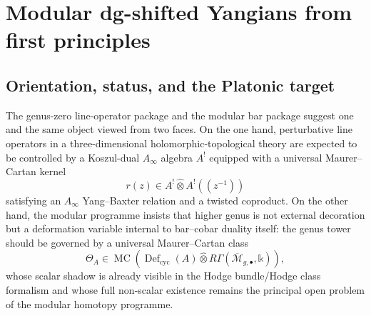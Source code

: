 

\providecommand{\MC}{\operatorname{MC}}
\providecommand{\Conf}{\operatorname{Conf}}
\providecommand{\Bar}{\operatorname{Bar}}
\providecommand{\Def}{\operatorname{Def}}
\providecommand{\Hom}{\operatorname{Hom}}
\providecommand{\im}{\operatorname{im}}
\providecommand{\id}{\operatorname{id}}
\providecommand{\op}{\mathrm{op}}
\providecommand{\gr}{\operatorname{gr}}
\providecommand{\pr}{\operatorname{pr}}
\providecommand{\Tot}{\operatorname{Tot}}
\providecommand{\Span}{\operatorname{Span}}
\providecommand{\Spec}{\operatorname{Spec}}
\providecommand{\Ann}{\operatorname{Ann}}
\providecommand{\Aut}{\operatorname{Aut}}
\providecommand{\Ord}{\mathrm{ord}}
\providecommand{\Coeff}{\mathrm{coeff}}
\providecommand{\Geom}{\mathrm{geom}}
\providecommand{\YB}{\mathrm{YB}}
\providecommand{\Ex}{\mathrm{Ex}}
\providecommand{\Ext}{\mathrm{ext}}
\providecommand{\full}{\mathrm{full}}
\providecommand{\pf}{\mathrm{pf}}
\providecommand{\conn}{\mathrm{conn}}
\providecommand{\ex}{\mathrm{ex}}
\providecommand{\bigtensor}{\mathbin{\widehat{\otimes}}}
\providecommand{\Bbbk}{\mathbb{k}}

\section{Modular dg-shifted Yangians from first principles}
\label{sec:modular-dg-shifted-yangians-first-principles}

\subsection{Orientation, status, and the Platonic target}

The genus-zero line-operator package and the modular bar package suggest one and the same
object viewed from two faces. On the one hand, perturbative line operators in a
three-dimensional holomorphic-topological theory are expected to be controlled by a Koszul-dual
$A_\infty$ algebra $A^!$ equipped with a universal Maurer--Cartan kernel
\[
r(z)\in A^!\bigtensor A^!((z^{-1}))
\]
satisfying an $A_\infty$ Yang--Baxter relation and a twisted coproduct.
On the other hand, the modular programme insists that higher genus is not external decoration
but a deformation variable internal to bar--cobar duality itself: the genus tower should be
governed by a universal Maurer--Cartan class
\[
\Theta_A \in \MC\!\left(\Def_{\mathrm{cyc}}(A)\bigtensor R\Gamma(\overline{\mathcal M}_{g,\bullet},\Bbbk)\right),
\]
whose scalar shadow is already visible in the Hodge bundle/Hodge class formalism and whose full
non-scalar existence remains the principal open problem of the modular homotopy programme.

